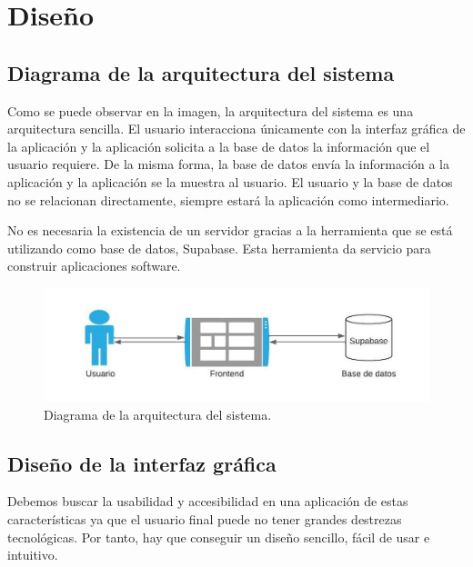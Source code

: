 \chapter{Diseño}
\label{chap:design}

\section{Diagrama de la arquitectura del sistema}

Como se puede observar en la imagen, la arquitectura del sistema es una arquitectura sencilla. El usuario interacciona únicamente con la interfaz gráfica de la aplicación y la aplicación solicita a la base de datos la información que el usuario requiere. De la misma forma, la base de datos envía la información a la aplicación y la aplicación se la muestra al usuario. El usuario y la base de datos no se relacionan directamente, siempre estará la aplicación como intermediario. 

No es necesaria la existencia de un servidor gracias a la herramienta que se está utilizando como base de datos, Supabase. Esta herramienta da servicio para construir aplicaciones software. 

\begin{figure}[ht]
	\centering
	\includegraphics[width=1\textwidth]{imagenes/imagenesDiagramas/DiagramaArquitecturaSistema.jpeg}
	\caption{Diagrama de la arquitectura del sistema.}
	\label{fig:diagArquitectura}
\end{figure}

\newpage

\section{Diseño de la interfaz gráfica}

Debemos buscar la usabilidad y accesibilidad en una aplicación de estas características ya que el usuario final puede no tener grandes destrezas tecnológicas. Por tanto, hay que conseguir un diseño sencillo, fácil de usar e intuitivo. \\

